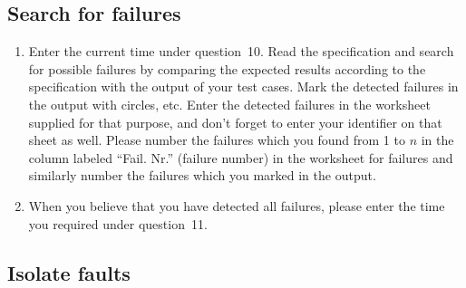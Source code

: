 \subsection*{Search for failures}

\begin{enumerate}
\addtocounter{enumi}{15}

\item Enter the current time under question~10.
Read the specification and search for possible failures by comparing
the expected results according to the specification with the output of
your test cases. 
Mark the detected failures in the output with circles, etc.
Enter the detected failures in the worksheet supplied for that purpose,
and don't forget to enter your identifier on that sheet as well.
Please number the failures which you found from 1 to $n$ in the
column labeled ``Fail. Nr.'' (failure number) in the worksheet for
failures and similarly number the failures which you marked in the 
output.

\item When you believe that you have detected all failures, please
enter the time you required under question~11.

\end{enumerate}

\subsection*{Isolate faults}

